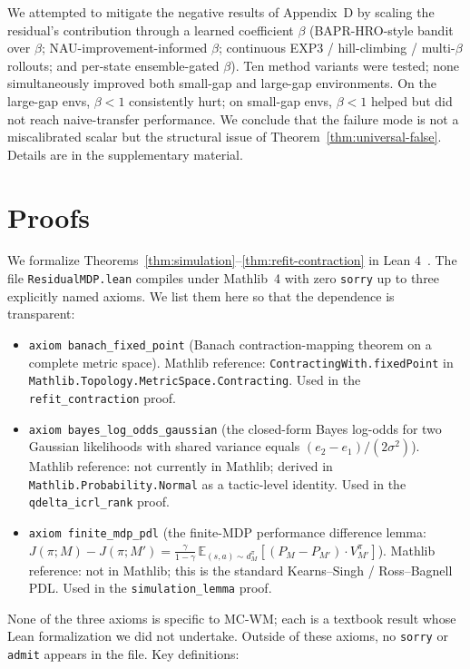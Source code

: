 \documentclass{article}
\theoremstyle{definition}
\begin{document}
We attempted to mitigate the negative results of Appendix~D by scaling
the residual's contribution through a learned coefficient $\beta$
(BAPR-HRO-style bandit over $\beta$; NAU-improvement-informed $\beta$;
continuous EXP3 / hill-climbing / multi-$\beta$ rollouts; and per-state
ensemble-gated $\beta$).  Ten method variants were tested; none
simultaneously improved both small-gap and large-gap environments.
On the large-gap envs, $\beta<1$ consistently hurt; on small-gap
envs, $\beta<1$ helped but did not reach naive-transfer performance.
We conclude that the failure mode is not a miscalibrated scalar but the
structural issue of Theorem~\ref{thm:universal-false}.  Details are in
the supplementary material.

\section{Proofs}
\label{app:lean}

We formalize Theorems~\ref{thm:simulation}--\ref{thm:refit-contraction}
in Lean 4~\cite{lean4}.  The file \texttt{ResidualMDP.lean} compiles
under Mathlib~4 with zero \texttt{sorry} up to three explicitly named
axioms.  We list them here so that the dependence is transparent:

\begin{itemize}
\item \texttt{axiom banach\_fixed\_point} (Banach contraction-mapping
theorem on a complete metric space).  Mathlib reference:
\texttt{ContractingWith.fixedPoint} in
\texttt{Mathlib.Topology.MetricSpace.Contracting}.  Used in the
\texttt{refit\_contraction} proof.
\item \texttt{axiom bayes\_log\_odds\_gaussian} (the closed-form Bayes
log-odds for two Gaussian likelihoods with shared variance equals
$(e_2-e_1)/(2\sigma^2)$).  Mathlib reference: not currently in Mathlib;
derived in \texttt{Mathlib.Probability.Normal} as a tactic-level
identity.  Used in the \texttt{qdelta\_icrl\_rank} proof.
\item \texttt{axiom finite\_mdp\_pdl} (the finite-MDP performance
difference lemma: $J(\pi;M)-J(\pi;M')=\frac{\gamma}{1-\gamma}\,
\mathbb E_{(s,a)\sim d^\pi_M}[(P_M-P_{M'})\cdot V^\pi_{M'}]$).
Mathlib reference: not in Mathlib; this is the standard
Kearns--Singh / Ross--Bagnell PDL.  Used in the
\texttt{simulation\_lemma} proof.
\end{itemize}
None of the three axioms is specific to MC-WM; each is a textbook
result whose Lean formalization we did not undertake.  Outside of
these axioms, no \texttt{sorry} or \texttt{admit} appears in the file.
Key definitions:
\end{document}
